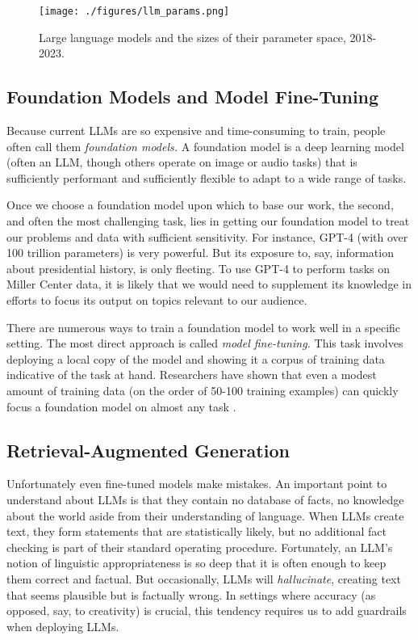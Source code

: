 \documentclass[12pt, oneside]{article}   	%
\begin{document}
\begin{figure}[htbp]
\begin{center}
\texttt{[image: ./figures/llm\_params.png]}
\caption{Large language models and the sizes of their parameter space, 2018-2023.}
\label{figure.llm_size}
\end{center}
\end{figure}


\subsection{Foundation Models and Model Fine-Tuning}\label{section.definitions.foundation-models}

Because current LLMs are so expensive and time-consuming to train, people often call them \emph{foundation models.}  A foundation model is a deep learning model (often an LLM, though others operate on image or audio tasks) that is sufficiently performant and sufficiently flexible to adapt to a wide range of tasks.  

Once we choose a foundation model upon which to base our work, the second, and often the most challenging task, lies in getting our foundation model to treat our problems and data with sufficient sensitivity.  For instance, GPT-4 (with over 100 trillion parameters) is very powerful.  But its exposure to, say, information about presidential history, is only fleeting.  To use GPT-4 to perform tasks on Miller Center data, it is likely that we would need to supplement its knowledge in efforts to focus its output on topics relevant to our audience.

There are numerous ways to train a foundation model to work well in a specific setting.  The most direct approach is called \emph{model fine-tuning.}  This task involves deploying a local copy of the model and showing it a corpus of training data indicative of the task at hand.  Researchers have shown that even a modest amount of training data (on the order of 50-100 training examples) can quickly focus a foundation model on almost any task \cite{liu:2022}.

\subsection{Retrieval-Augmented Generation}\label{section.definitions.rag}
Unfortunately even fine-tuned models make mistakes.  An important point to understand about LLMs is that they contain no database of facts, no knowledge about the world aside from their understanding of language.  When LLMs create text, they form statements that are statistically likely, but no additional fact checking is part of their standard operating procedure.  Fortunately, an LLM's notion of linguistic appropriateness is so deep that it is often enough to keep them correct and factual.  But occasionally, LLMs will \emph{hallucinate}, creating text that seems plausible but is factually wrong.  In settings where accuracy (as opposed, say, to creativity) is crucial, this tendency requires us to add guardrails when deploying LLMs.
\end{document}
